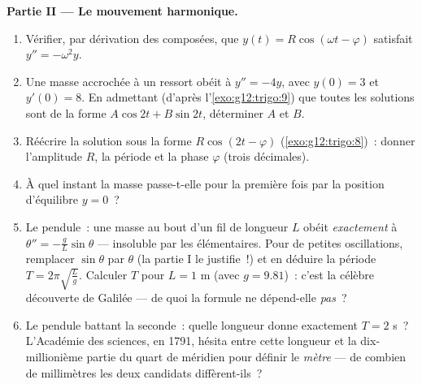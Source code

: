 \begin{problem}
\medskip
\noindent\textbf{Partie II --- Le mouvement harmonique.}
\begin{enumerate}[resume]
  \item Vérifier, par dérivation des  composées, que
        $y(t) = R\cos(\omega t - \varphi)$ satisfait
        $y'' = -\omega^2 y$.
  \item Une masse accrochée à un ressort obéit à $y'' = -4y$, avec
        $y(0) = 3$ et $y'(0) = 8$. En admettant (d'après
        l'\cref{exo:g12:trigo:9}) que toutes les solutions sont de
        la forme $A\cos 2t + B\sin 2t$, déterminer $A$ et $B$.
  \item Réécrire la solution sous la forme $R\cos(2t - \varphi)$
        (\cref{exo:g12:trigo:8})~: donner l'amplitude $R$, la
        période et la phase $\varphi$ (trois décimales).
  \item À quel instant la masse passe-t-elle pour la première fois
        par la position d'équilibre $y = 0$~?
  \item Le pendule~: une masse au bout d'un fil de longueur $L$
        obéit \emph{exactement} à $\theta'' = -\frac gL
        \sin\theta$ ---  insoluble par les 
        élémentaires. Pour de petites oscillations, remplacer
        $\sin\theta$ par $\theta$ (la partie I le justifie~!) et en
        déduire la période $T = 2\pi\sqrt{\frac Lg}$. Calculer $T$
        pour $L = 1$ m (avec $g = 9.81$)~: c'est la célèbre
        découverte de Galilée --- de quoi la formule ne dépend-elle
        \emph{pas}~?
  \item Le pendule battant la seconde~: quelle longueur donne
        exactement $T = 2$ s~? L'Académie des sciences, en 1791,
        hésita entre cette longueur et la dix-millionième partie du
        quart de méridien pour définir le \emph{mètre} --- de
        combien de millimètres les deux candidats
        diffèrent-ils~?
\end{enumerate}


\end{problem}
